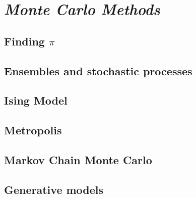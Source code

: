 \chapter{\emph{Monte Carlo Methods}} 
\label{MCmethods}

\section{Finding $\pi$ }
\section{Ensembles and stochastic processes}
\section{Ising Model}
\section{Metropolis}
\section{Markov Chain Monte Carlo}
\section{Generative models}